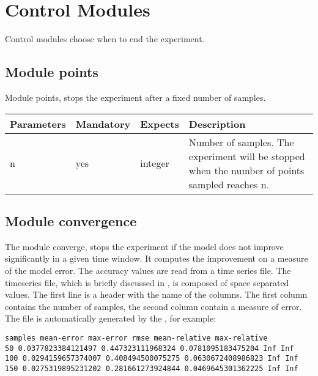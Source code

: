 \section{Control Modules}

Control modules choose when to end the experiment. 

\subsection{Module points}

Module points, stops the experiment after a fixed number of samples.

	\vspace{0.5cm}\begin{tabular}{| p{} | p{} | p{} | p{}  |}
		\hline
		\textbf{ Parameters} & \textbf{ Mandatory} & \textbf{ Expects} & \textbf{ Description} \\ \hline
		 n &  yes &  integer &  Number of samples. The experiment will be stopped when the number of points sampled reaches n. \\ \hline
	\end{tabular}

\subsection{Module convergence}

The module converge, stops the experiment if the model does not improve significantly in a given time window.
It computes the improvement on a measure of the model error. The accuracy values are read from a time series file. The timeseries file, which is briefly discussed in , is composed of space separated values. 
The first line is a header with the name of the columns. The first column contains the number of
samples, the second column contain a measure of error. The file is automatically generated by
the , for example:

\begin{verbatim}
samples mean-error max-error rmse mean-relative max-relative
50 0.0377823384121497 0.447323111968324 0.0781095183475204 Inf Inf
100 0.0294159657374007 0.408494500075275 0.0630672408986823 Inf Inf
150 0.0275319895231202 0.281661273924844 0.0469645301362225 Inf Inf
\end{verbatim}

